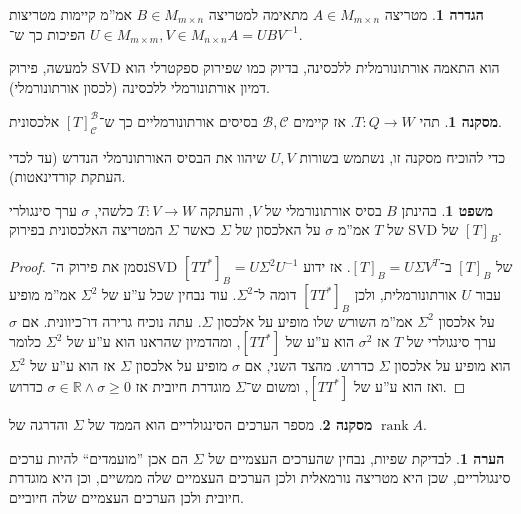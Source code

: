 \documentclass[a4paper]{article}
\newcommand\R     {\mathbb{R}}
\newcommand\bc    {\mathcal{B}}
\newcommand\cc    {\mathcal{C}}
\DeclareMathOperator{\rk}      {rank}
\newcommand\co        {\colon}
\newcommand\sg        {\sigma}
\newcommand\Sg        {\Sigma}
\newcommand\op    {^{-1}}
\theoremstyle{definition}
\newtheorem{Theorem}{\color{myblue}משפט}
\newtheorem{Definition}{\color{mygreen}הגדרה}
\newtheorem{Remark}{\color{mycyan}הערה}
\newtheorem{Collary}{\color{mymagenta}מסקנה}
\newcommand\cola [1] {\begin{Collary}#1\end{Collary}}
\newcommand\defi  [1] {\begin{Definition}#1\end{Definition}}
\newcommand\rmark [1] {\begin{Remark}#1\end{Remark}}
\begin{document}
	\defi{מטריצה $A \in M_{m \times n}$ מתאימה למטריצה $B \in M_{m \times n}$ אמ''מ קיימות מטריצות $U \in M_{m \times m}, V \in M_{n \times n}$ הפיכות כך ש־$A = UBV\op$. }
	למעשה, פירוק SVD הוא התאמה אורתונורמלית ללכסינה, בדיוק כמו שפירוק ספקטרלי הוא דמיון אורתונורמלי ללכסינה (לכסון אורתונורמלי). 
	\cola{תהי $T \co Q \to W$. אז קיימים $\bc, \cc$ בסיסים אורתונורמליים כך ש־$[T]^{\bc}_{\cc}$ אלכסונית. }
	כדי להוכיח מסקנה זו, נשתמש בשורות $U, V$ שיהוו את הבסיס האורתונרמלי הנדרש (עד לכדי העתקת קורדינאטות). 
	
	\begin{Theorem}
		בהינתן $B$ בסיס אורתונורמלי של $V$, והעתקה $T \co V \to W$ כלשהי, $\sg$ ערך סינגולרי של $T$ אמ''מ $\sg$ על האלכסון של $\Sg$ כאשר $\Sg$ המטריצה האלכסונית בפירוק SVD של $[T]_B$. 
	\end{Theorem}
	\begin{proof}
		נסמן את פירוק ה־SVD של $[T]_B$ ב־$[T]_B = U\Sg V^{T}$. אז ידוע $[TT^*]_B = U\Sg^2 U\op$ עבור $U$ אורתונורמלית, ולכן $[TT^*]_B$ דומה ל־$\Sg^2$. עוד נבחין שכל ע''ע של $\Sg^2$ אמ''מ מופיע על אלכסון $\Sg^2$ אמ''מ השורש שלו מופיע על אלכסון $\Sg$. עתה נוכיח גרירה דו־כיוונית. אם $\sg$ ערך סינגולרי של $T$ אז $\sg^2$ הוא ע''ע של $[TT^*]$, ומהדמיון שהראנו הוא ע''ע של $\Sg^2$ כלומר הוא מופיע על אלכסון $\Sg$ כדרוש. מהצד השני, אם $\sg$ מופיע על אלכסון $\Sg$ אז הוא ע''ע של $\Sg^2$ ואז הוא ע''ע של $[TT^*]$, ומשום ש־$\Sg$ מוגדרת חיובית אז $\sg \in \R \land \sg \ge 0$ כדרוש. 
	\end{proof}
	\cola{מספר הערכים הסינגולריים הוא הממד של $\Sg$ והדרגה של $\rk A$. }
	\rmark{לבדיקת שפיות, נבחין שהערכים העצמיים של $\Sg$ הם אכן ''מועמדים`` להיות ערכים סינגולריים, שכן היא מטריצה נורמאלית ולכן הערכים העצמיים שלה ממשיים, וכן היא מוגדרת חיובית ולכן הערכים העצמיים שלה חיוביים. }
	
\end{document}
